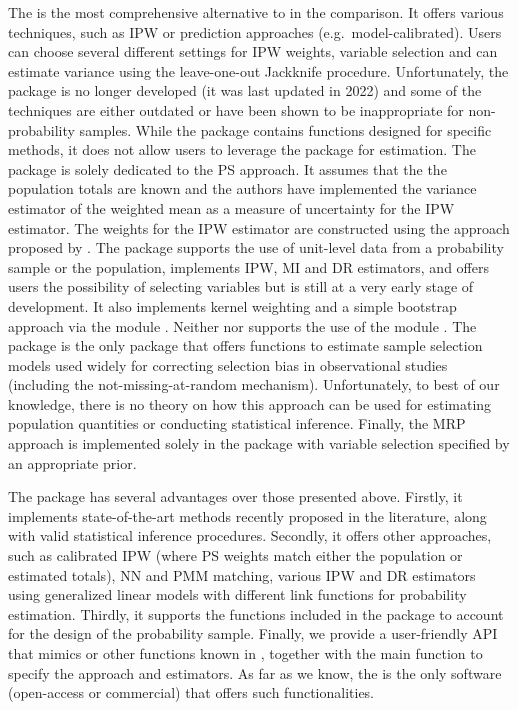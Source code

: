 \documentclass[
]{jss}
\begin{document}
The  is the most comprehensive alternative to
 in the comparison. It offers various techniques, such
as IPW or prediction approaches (e.g.~model-calibrated). Users can
choose several different settings for IPW weights, variable selection
and can estimate variance using the leave-one-out Jackknife procedure.
Unfortunately, the package is no longer developed (it was last updated
in 2022) and some of the techniques are either outdated or have been
shown to be inappropriate for non-probability samples. While the package
contains functions designed for specific methods, it does not allow
users to leverage the  package for estimation. The
 package is solely dedicated to the PS approach. It assumes
that the the population totals are known and the authors have
implemented the variance estimator of the weighted mean as a measure of
uncertainty for the IPW estimator. The weights for the IPW estimator are
constructed using the approach proposed by \citet{Schonlau2017}. The
 package supports the use of unit-level data from a
probability sample or the population, implements IPW, MI and DR
estimators, and offers users the possibility of selecting variables but
is still at a very early stage of development. It also implements kernel
weighting and a simple bootstrap approach via the 
module \citep{scipy2020}. Neither  nor  supports
the use of the  module \citep{Diallo2021}. The 
package is the only package that offers functions to estimate sample
selection models used widely for correcting selection bias in
observational studies (including the not-missing-at-random mechanism).
Unfortunately, to best of our knowledge, there is no theory on how this
approach can be used for estimating population quantities or conducting
statistical inference. Finally, the MRP approach is implemented solely
in the  package with variable selection specified by an
appropriate prior.

The  package has several advantages over those presented
above. Firstly, it implements state-of-the-art methods recently proposed
in the literature, along with valid statistical inference procedures.
Secondly, it offers other approaches, such as calibrated IPW (where PS
weights match either the population or estimated totals), NN and PMM
matching, various IPW and DR estimators using generalized linear models
with different link functions for probability estimation. Thirdly, it
supports the functions included in the  package to account
for the design of the probability sample. Finally, we provide a
user-friendly API that mimics  or other functions known in
, together with the main function to specify the approach
and estimators. As far as we know, the  is the only
software (open-access or commercial) that offers such functionalities.
\end{document}
